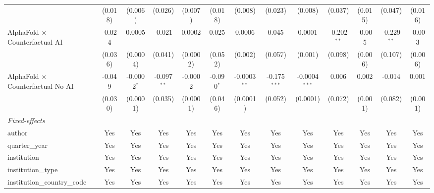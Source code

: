 \begin{tabular}{lcccccccccccc}
                                            & (0.018)       & (0.006)       & (0.026)       & (0.007)  & (0.018)      & (0.008)        & (0.023)        & (0.008)         & (0.037)       & (0.015) & (0.047)       & (0.016)\\   
   AlphaFold $\times$ Counterfactual AI     & -0.024        & 0.0005        & -0.021        & 0.0002   & 0.025        & 0.0006         & 0.045          & 0.0001          & -0.202$^{**}$ & -0.005  & -0.229$^{**}$ & -0.003\\   
                                            & (0.036)       & (0.0004)      & (0.041)       & (0.0002) & (0.052)      & (0.002)        & (0.057)        & (0.001)         & (0.098)       & (0.006) & (0.107)       & (0.006)\\   
   AlphaFold $\times$ Counterfactual No AI  & -0.049        & -0.0002$^{*}$ & -0.097$^{**}$ & -0.0002  & -0.090$^{*}$ & -0.0003$^{**}$ & -0.175$^{***}$ & -0.0004$^{***}$ & 0.006         & 0.002   & -0.014        & 0.001\\   
                                            & (0.030)       & (0.0001)      & (0.035)       & (0.0001) & (0.046)      & (0.0001)       & (0.052)        & (0.0001)        & (0.072)       & (0.001) & (0.082)       & (0.001)\\   
   \midrule
   \emph{Fixed-effects}\\
   author                                   & Yes           & Yes           & Yes           & Yes      & Yes          & Yes            & Yes            & Yes             & Yes           & Yes     & Yes           & Yes\\  
   quarter\_year                            & Yes           & Yes           & Yes           & Yes      & Yes          & Yes            & Yes            & Yes             & Yes           & Yes     & Yes           & Yes\\  
   institution                              & Yes           & Yes           & Yes           & Yes      & Yes          & Yes            & Yes            & Yes             & Yes           & Yes     & Yes           & Yes\\  
   institution\_type                        & Yes           & Yes           & Yes           & Yes      & Yes          & Yes            & Yes            & Yes             & Yes           & Yes     & Yes           & Yes\\  
   institution\_country\_code               & Yes           & Yes           & Yes           & Yes      & Yes          & Yes            & Yes            & Yes             & Yes           & Yes     & Yes           & Yes\\  

\end{tabular}
